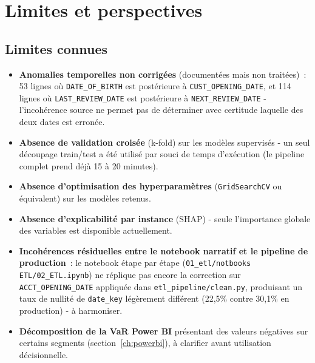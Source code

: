 \documentclass[11pt,a4paper]{report}
\begin{document}
\chapter{Limites et perspectives}
\label{ch:limites}

\section{Limites connues}

\begin{itemize}
\item \textbf{Anomalies temporelles non corrig\'ees} (document\'ees mais non
      trait\'ees)~: 53 lignes o\`u \texttt{DATE\_OF\_BIRTH} est post\'erieure \`a
      \texttt{CUST\_OPENING\_DATE}, et 114 lignes o\`u
      \texttt{LAST\_REVIEW\_DATE} est post\'erieure \`a
      \texttt{NEXT\_REVIEW\_DATE} - l'incoh\'erence source ne permet pas de
      d\'eterminer avec certitude laquelle des deux dates est erron\'ee.
\item \textbf{Absence de validation crois\'ee} (k-fold) sur les mod\`eles
      supervis\'es - un seul d\'ecoupage train/test a \'et\'e utilis\'e par souci
      de temps d'ex\'ecution (le pipeline complet prend d\'ej\`a 15 \`a 20
      minutes).
\item \textbf{Absence d'optimisation des hyperparam\`etres}
      (\texttt{GridSearchCV} ou \'equivalent) sur les mod\`eles retenus.
\item \textbf{Absence d'explicabilit\'e par instance} (SHAP) - seule
      l'importance globale des variables est disponible actuellement.
\item \textbf{Incoh\'erences r\'esiduelles entre le notebook narratif et le
      pipeline de production}~: le notebook \'etape par étape
      (\texttt{01\_etl/notbooks ETL/02\_ETL.ipynb}) ne r\'eplique pas encore la
      correction sur \texttt{ACCT\_OPENING\_DATE} appliqu\'ee dans
      \texttt{etl\_pipeline/clean.py}, produisant un taux de nullit\'e de
      \texttt{date\_key} l\'eg\`erement diff\'erent (22,5\% contre 30,1\% en
      production) - \`a harmoniser.
\item \textbf{D\'ecomposition de la VaR Power BI} pr\'esentant des valeurs
      n\'egatives sur certains segments (section~\ref{ch:powerbi}), \`a
      clarifier avant utilisation d\'ecisionnelle.
\end{itemize}
\end{document}
